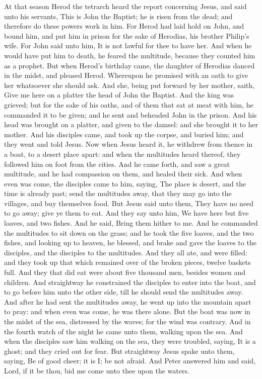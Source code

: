 At that season Herod the tetrarch heard the report concerning Jesus, and said unto his servants, This is John the Baptist; he is risen from the dead; and therefore do these powers work in him. For Herod had laid hold on John, and bound him, and put him in prison for the sake of Herodias, his brother Philip’s wife. For John said unto him, It is not lawful for thee to have her. And when he would have put him to death, he feared the multitude, because they counted him as a prophet. But when Herod’s birthday came, the daughter of Herodias danced in the midst, and pleased Herod. Whereupon he promised with an oath to give her whatsoever she should ask. And she, being put forward by her mother, saith, Give me here on a platter the head of John the Baptist. And the king was grieved; but for the sake of his oaths, and of them that sat at meat with him, he commanded it to be given; and he sent and beheaded John in the prison. And his head was brought on a platter, and given to the damsel: and she brought it to her mother. And his disciples came, and took up the corpse, and buried him; and they went and told Jesus.  Now when Jesus heard it, he withdrew from thence in a boat, to a desert place apart: and when the multitudes heard thereof, they followed him on foot from the cities. And he came forth, and saw a great multitude, and he had compassion on them, and healed their sick. And when even was come, the disciples came to him, saying, The place is desert, and the time is already past; send the multitudes away, that they may go into the villages, and buy themselves food. But Jesus said unto them, They have no need to go away; give ye them to eat. And they say unto him, We have here but five loaves, and two fishes. And he said, Bring them hither to me. And he commanded the multitudes to sit down on the grass; and he took the five loaves, and the two fishes, and looking up to heaven, he blessed, and brake and gave the loaves to the disciples, and the disciples to the multitudes. And they all ate, and were filled: and they took up that which remained over of the broken pieces, twelve baskets full. And they that did eat were about five thousand men, besides women and children.  And straightway he constrained the disciples to enter into the boat, and to go before him unto the other side, till he should send the multitudes away. And after he had sent the multitudes away, he went up into the mountain apart to pray: and when even was come, he was there alone. But the boat was now in the midst of the sea, distressed by the waves; for the wind was contrary. And in the fourth watch of the night he came unto them, walking upon the sea. And when the disciples saw him walking on the sea, they were troubled, saying, It is a ghost; and they cried out for fear. But straightway Jesus spake unto them, saying, Be of good cheer; it is I; be not afraid. And Peter answered him and said, Lord, if it be thou, bid me come unto thee upon the waters. 